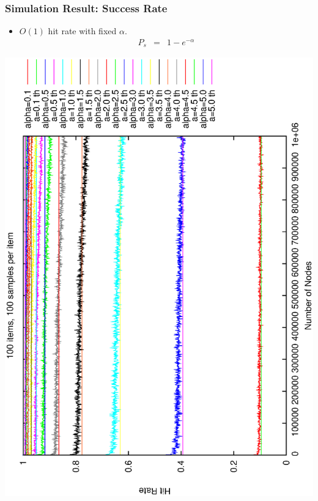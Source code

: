 \documentclass[red]{beamer}
\begin{document}
\begin{frame}
\frametitle{Simulation Result: Success Rate}
\begin{itemize}
\item $O(1)$ hit rate with fixed $\alpha$.
\begin{eqnarray*}
P_s &=& 1-e^{-\alpha}
\end{eqnarray*}
\end{itemize}
\center
\includegraphics[angle=270, scale=0.26]{figs/th_hitrate.eps}

\end{frame}
\end{document}
